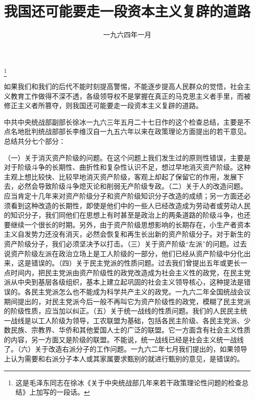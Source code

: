 
\title{我国还可能要走一段资本主义复辟的道路}
\date{一九六四年一月}
\thanks{这是毛泽东同志在徐冰《关于中央统战部几年来若干政策理论性问题的检查总结》上加写的一段话。}
\maketitle


如果我们和我们的后代不能时刻提高警惕，不能逐步提高人民群众的觉悟，社会主义教育工作做得不深不透，各级领导权不是掌握在真正的马克思主义者手里，而被修正主义者所篡夺，则我国还可能要走一段资本主义复辟的道路。

\begin{maonote}
中共中央统战部副部长徐冰一九六三年五月二十七日作的这个检查总结，主要是不点名地批判统战部部长李维汉自一九五六年以来在政策理论方面提出的若干意见。总结共分七个部分：

（一）关于消灭资产阶级的问题。在这个问题上我们发生过的原则性错误，主要是对于阶级斗争的长期性、曲折性和复杂性认识不足，想过早地消灭资产阶级。这种主观上想比较快、比较早地消灭资产阶级，客观上却起了保留它的作用，发展下去，必然会导致阶级斗争熄灭论和削弱无产阶级专政。（二）关于人的改造问题。应当肯定十几年来对资产阶级分子和资产阶级知识分子改造的成绩；另一方面还必须看到这种改造的长期性，即使是他们中的一些人已经改造成为劳动者或劳动人民的知识分子，我们同他们在思想上有时甚至是政治上的两条道路的阶级斗争，也还要继续一个很长的时期。另外，由于资产阶级思想影响的长期存在，小生产者资本主义自发势力还没有消灭，必然会恢复和再生长出新的资产阶级分子。对于新生的资产阶级分子，我们必须坚决予以打击。（三）关于资产阶级“左派”的问题。过去说资产阶级左派在政治立场上是工人阶级的一部分，他们已经从资产阶级中分化出来，这是错误的。（四）关于民主党派的性质问题。过去我们曾提出五年或更长一点时间内，把民主党派由资产阶级性的政党改造成为社会主义性的政党，在民主党派从中央到基层各级组织，基本上建立起巩固的社会主义领导核心，这种提法是错误的。各民主党派怎么也不能成为科学共产主义的政党。一九六二年全国统战会议期间提出的，对民主党派今后一般不再叫它为资产阶级性的政党，模糊了民主党派的阶级性质，应当加以纠正。（五）关于统一战线的性质问题。我们的人民民主统一战线是以工人阶级为领导，工农联盟为基础，包括各民主阶级、各民主党派、少数民族、宗教界、华侨和其他爱国人士的广泛的联盟。它一方面含有社会主义性质的内容，另一方面又是阶级的联盟。不能说，统一战线已经是社会主义统一战线了。（六）关于改造右派分子的工作问题。一九六二年七月我们提出的，如果领导上认为需要和右派分子本人或其家属要求甄别的就进行甄别的意见，是错误的。


\end{maonote}
